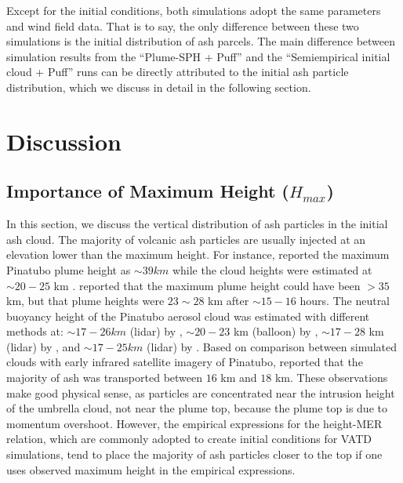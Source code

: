 \documentclass[utf8]{frontiersSCNS} %
\begin{document}
Except for the initial conditions, both simulations adopt the same parameters and wind field data. That is to say, the only difference between these two simulations is the initial distribution of ash parcels. The main difference between simulation results from the ``Plume-SPH + Puff'' and the ``Semiempirical initial cloud + Puff'' runs can be directly attributed to the initial ash particle distribution, which we discuss in detail in the following section.

\section{Discussion}
\subsection{Importance of Maximum Height ($H_{max}$)}

In this section, we discuss the vertical distribution of ash particles in the initial ash cloud.
The majority of volcanic ash particles are usually  injected at an elevation lower than the maximum height. For instance, \citet{holasek1996satellite, holasek1996experiments} reported the maximum Pinatubo plume height as $\sim 39 km$ while the cloud heights were estimated at $\sim 20  - 25$ km . \citet{self1993atmospheric} reported that the maximum plume height could have been $>35$ km, but that plume heights were $23 \sim 28$ km after $\sim 15-16$ hours. The neutral buoyancy height of the Pinatubo aerosol cloud was estimated with different methods at: $\sim 17-26 km$ (lidar) by \citet{defoor1992early}, $\sim 20-23$ km (balloon) by \citet{deshler1992balloonborne}, $\sim 17-28$ km (lidar) by \citet{jager1992pinatubo}, and $\sim 17-25 km$ (lidar) by \citet{avdyushin19931}. Based on comparison between simulated clouds with early infrared satellite imagery of Pinatubo, \citet{fero2008simulation} reported that the majority of ash was transported between $16$ km and $18$ km. These observations make good physical sense, as particles are concentrated near the intrusion height of the umbrella cloud, not near the plume top, because the plume top is due to momentum overshoot. However, the empirical expressions for the height-MER relation, which are commonly adopted to create initial conditions for VATD simulations, tend to place the majority of ash particles closer to the top if one uses observed maximum height in the empirical expressions.
\end{document}
